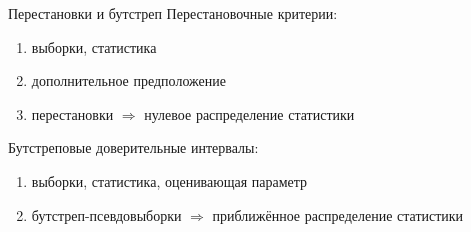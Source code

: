 \documentclass[11pt,pdf,utf8,hyperref={unicode},aspectratio=169]{beamer}
\begin{document}
\begin{frame}{Перестановки и бутстреп}
	Перестановочные критерии:
	\begin{enumerate}
		\item выборки, статистика
		\item дополнительное предположение
		\item перестановки  $\Rightarrow$ нулевое распределение статистики
	\end{enumerate}

	\bigskip

	Бутстреповые доверительные интервалы:
	\begin{enumerate}
		\item выборки, статистика, оценивающая параметр
		\item бутстреп-псевдовыборки  $\Rightarrow$ приближённое распределение статистики
	\end{enumerate}
\end{frame}
\end{document}
